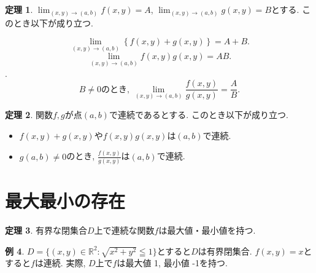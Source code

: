 \documentclass[dvipdfmx,a4paper,11pt]{article}
\newcommand{\R}{\mathbb{R}}
\theoremstyle{definition}
\newtheorem{thm}{定理}
\newtheorem{exa}[thm]{例}
\newcommand{\pdrv}[2]{\frac{\partial #1}{\partial #2}}
\begin{document}
\begin{tcolorbox}[
    colback = white,
    colframe = green!35!black,
    fonttitle = \bfseries,
    breakable = true]
    \begin{thm}
     $\lim_{(x,y) \rightarrow (a,b)} f(x,y) =A$, $ \lim_{(x,y) \rightarrow (a,b)} g(x,y) =B$とする. このとき以下が成り立つ.
     
 $$  \lim_{(x,y) \rightarrow (a,b)} \left\{ f(x,y) + g(x,y)\right\} =A+B.$$
  $$  \lim_{(x,y) \rightarrow (a,b)} f(x,y) g(x,y) =AB.$$.
   $$\text{$B \neq 0$のとき, }  \lim_{(x,y) \rightarrow (a,b)} \frac{f(x,y) }{ g(x,y)} =\frac{A}{B}.$$
    \end{thm}
\end{tcolorbox}
\begin{tcolorbox}[
    colback = white,
    colframe = green!35!black,
    fonttitle = \bfseries,
    breakable = true]
    \begin{thm}
    \label{continess}
    関数$f,g$が点$(a,b)$で連続であるとする. このとき以下が成り立つ.
    \begin{itemize}
    \item $f(x,y) + g(x,y)$や$f(x,y)g(x,y)$は$(a,b)$で連続.
    \item $g(a,b) \neq 0$のとき, $\frac{f(x,y) }{ g(x,y)} $は$(a,b)$で連続.
    \end{itemize}

    \end{thm}
\end{tcolorbox}



\section{最大最小の存在}
\begin{tcolorbox}[
    colback = white,
    colframe = green!35!black,
    fonttitle = \bfseries,
    breakable = true]
    \begin{thm}
    有界な閉集合$D$上で連続な関数$f$は最大値・最小値を持つ.
    \end{thm}
\end{tcolorbox}

\begin{exa}
$D = \{ (x,y) \in \R^2 : \sqrt{x^2 + y^2} \leqq 1  \}$とすると$D$は有界閉集合.
$f(x,y) =x$とすると$f$は連続. 
実際, $D$上で$f$は最大値 1, 最小値 -1を持つ.
\end{exa}


\end{document}
